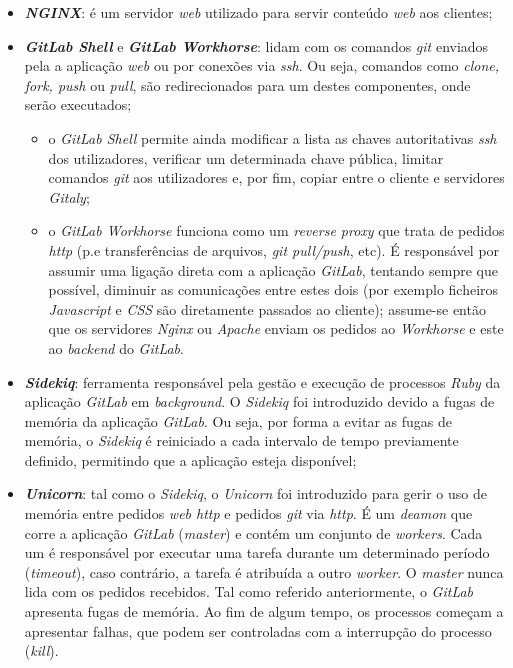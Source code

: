 \documentclass[12pt,a4paper]{article}
\begin{document}
\begin{itemize}
    \item \emph{\textbf{NGINX}}: é um servidor \emph{web} utilizado para servir conteúdo \emph{web} aos clientes;
    \item \emph{\textbf{GitLab Shell}} e \emph{\textbf{GitLab Workhorse}}: lidam com os comandos \emph{git} enviados pela a aplicação \emph{web} ou por conexões via \emph{ssh}. Ou seja, comandos como \emph{clone, fork, push} ou \emph{pull}, são redirecionados para um destes componentes, onde serão executados;
    \begin{itemize}
        \item o \emph{GitLab Shell} permite ainda modificar a lista as chaves autoritativas \emph{ssh} dos utilizadores, verificar um determinada chave pública, limitar comandos \emph{git} aos utilizadores e, por fim, copiar entre o cliente e servidores \emph{Gitaly};
        \item o \emph{GitLab Workhorse} funciona como um \emph{reverse proxy} que trata de pedidos \emph{http} (p.e transferências de arquivos, \emph{git pull/push}, etc). É responsável por assumir uma ligação direta com a aplicação \emph{GitLab}, tentando sempre que possível, diminuir as comunicações entre estes dois (por exemplo ficheiros \emph{Javascript} e \emph{CSS} são diretamente passados ao cliente); assume-se então que os servidores \emph{Nginx} ou \emph{Apache} enviam os pedidos ao \emph{Workhorse} e este ao \emph{backend} do \emph{GitLab}.
    \end{itemize}
    \item \emph{\textbf{Sidekiq}}: ferramenta responsável pela gestão e execução de processos \emph{Ruby} da aplicação \emph{GitLab} em \emph{background}. O \emph{Sidekiq} foi introduzido devido a fugas de memória da aplicação \emph{GitLab}. Ou seja, por forma a evitar as fugas de memória, o \emph{Sidekiq} é reiniciado a cada intervalo de tempo previamente definido, permitindo que a aplicação esteja disponível;
    \item \emph{\textbf{Unicorn}}: tal como o \emph{Sidekiq}, o \emph{Unicorn} foi introduzido para gerir o uso de memória entre pedidos \emph{web http} e pedidos \emph{git} via \emph{http}. É um \emph{deamon} que corre a aplicação \emph{GitLab} (\emph{master}) e contém um conjunto de \emph{workers}. Cada um é responsável por executar uma tarefa durante um determinado período (\emph{timeout}), caso contrário, a tarefa é atribuída a outro \emph{worker}. O \emph{master} nunca lida com os pedidos recebidos. Tal como referido anteriormente, o \emph{GitLab} apresenta fugas de memória. Ao fim de algum tempo, os processos começam a apresentar falhas, que podem ser controladas com a interrupção do processo (\emph{kill}).
\end{itemize}
\end{document}
